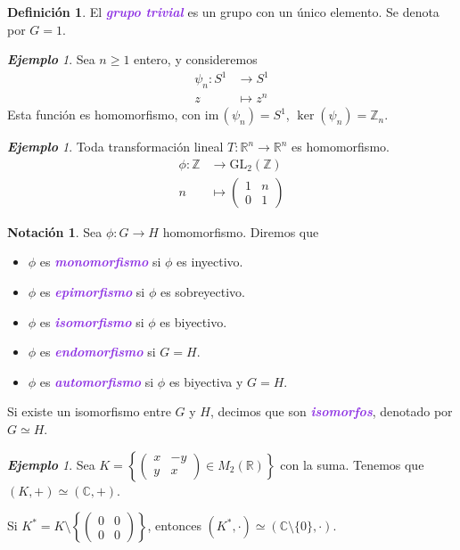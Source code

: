 \documentclass{article}
\theoremstyle{definition}
\newtheorem{definition}[theorem]{Definición}
\newtheorem*{notation}{Notación}
\theoremstyle{remark}
\newtheorem{example}[theorem]{\textbf{Ejemplo}}
\numberwithin{equation}{section}
\newcommand{\C}{\mathbb{C}}
\newcommand{\R}{\mathbb{R}}
\newcommand{\Z}{\mathbb{Z}}
\renewcommand{\c}{\cdot}
\newcommand{\im}{\mathrm{im}\,}
\newcommand{\GL}{\mathrm{GL}}
\newcommand{\set}[1]{\left\{ #1 \right\}}
\newcommand{\matr}[1]{\begin{pmatrix}#1\end{pmatrix}}
\newcommand{\wea}[1]{\textcolor{BlueViolet}{\textbf{\emph{#1}}}}
\begin{document}
\begin{definition}
  El \wea{grupo trivial} es un grupo con un único elemento. Se denota por $G = 1$.
\end{definition}

\begin{example}
  Sea $n \geq 1$ entero, y consideremos
  \begin{align*}
    \psi_n \colon S^1 &\to S^1 \\
    z &\mapsto z^n
  \end{align*}
  Esta función es homomorfismo, con $\im(\psi_n) = S^1$, $\ker(\psi_n) = \Z_n$.
\end{example}

\begin{example}
  Toda transformación lineal $T \colon \R^n \to \R^n$ es homomorfismo.
  \begin{align*}
    \phi \colon \Z &\to \GL_2(\Z) \\
    n &\mapsto \matr{1&n\\0&1}
  \end{align*}
\end{example}

\begin{notation}
  Sea $\phi \colon G \to H$ homomorfismo. Diremos que
  \begin{itemize}
    \item $\phi$ es \wea{monomorfismo} si $\phi$ es inyectivo.
    \item $\phi$ es \wea{epimorfismo} si $\phi$ es sobreyectivo.
    \item $\phi$ es \wea{isomorfismo} si $\phi$ es biyectivo.
    \item $\phi$ es \wea{endomorfismo} si $G=H$.
    \item $\phi$ es \wea{automorfismo} si $\phi$ es biyectiva y $G=H$.
  \end{itemize}
  Si existe un isomorfismo entre $G$ y $H$, decimos que son \wea{isomorfos}, denotado por $G \simeq H$.
\end{notation}

\begin{example}
  Sea $K = \set{\matr{x&-y\\y&x} \in M_2(\R)}$ con la suma. Tenemos que $(K,+) \simeq (\C,+)$.

  Si $K^\ast = K \setminus \set{\matr{0&0\\0&0}}$, entonces $(K^\ast,\c) \simeq (\C \setminus \{0\}, \c)$.
\end{example}
\end{document}
